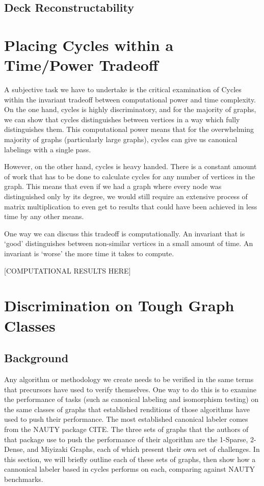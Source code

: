 \documentclass[11pt,a4paper]{report}
\begin{document}
\subsection{Deck Reconstructability}

\section{Placing Cycles within a Time/Power Tradeoff}
A subjective task we have to undertake is the critical examination of Cycles within the invariant tradeoff between computational power and time complexity.
On the one hand, cycles is highly discriminatory, and for the majority of graphs, we can show that cycles distinguishes between vertices in a way which fully distinguishes them.
This computational power means that for the overwhelming majority of graphs (particularly large graphs), cycles can give us canonical labelings with a single pass.

However, on the other hand, cycles is heavy handed. There is a constant amount of work that has to be done to calculate cycles for any number of vertices in the graph. 
This means that even if we had a graph where every node was distinguished only by its degree, we would still require an extensive process of matrix multiplication to even get to results that could have been achieved in less time by any other means.

One way we can discuss this tradeoff is computationally.
An invariant that is `good' distinguishes between non-similar vertices in a small amount of time.
An invariant is `worse' the more time it takes to compute.

[COMPUTATIONAL RESULTS HERE] 

\section{Discrimination on Tough Graph Classes}
\subsection{Background}
Any algorithm or methodology we create needs to be verified in the same terms that precursors have used to verify themselves.
One way to do this is to examine the performance of tasks (such as canonical labeling and isomorphism testing) on the same classes of graphs that established renditions of those algorithms have used to push their performance.
The most established canonical labeler comes from the NAUTY package CITE.
The three sets of graphs that the authors of that package use to push the performance of their algorithm are the 1-Sparse, 2-Dense, and Miyizaki Graphs, each of which present their own set of challenges.
In this section, we will briefly outline each of these sets of graphs, then show how a cannonical labeler based in cycles performs on each, comparing against NAUTY benchmarks.
\end{document}
